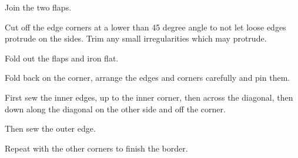 Join the two flaps.


Cut off the edge corners at a lower than 45 degree angle to not let
loose edges protrude on the sides. Trim any small irregularities which
may protrude.

Fold out the flaps and iron flat.


Fold back on the corner, arrange the edges and corners carefully and pin
them.


First sew the inner edges, up to the inner corner, then across the
diagonal, then down along the diagonal on the other side and off the
corner.

Then sew the outer edge.




Repeat with the other corners to finish the border.


